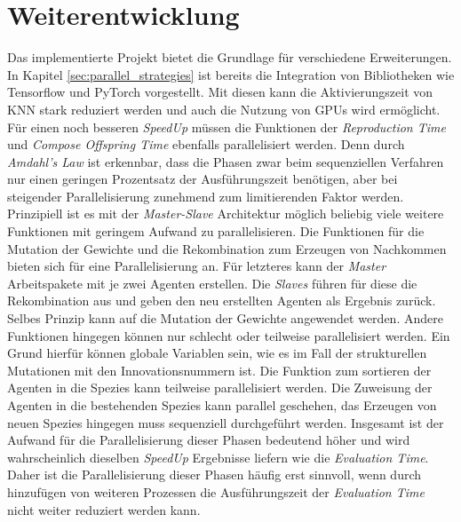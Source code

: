 \section{Weiterentwicklung}
Das implementierte Projekt bietet die Grundlage für verschiedene Erweiterungen. In Kapitel \ref{sec:parallel_strategies} ist bereits die Integration von Bibliotheken wie Tensorflow und PyTorch vorgestellt. Mit diesen kann die Aktivierungszeit von \ac{KNN} stark reduziert werden und auch die Nutzung von \acp{GPU} wird ermöglicht. Für einen noch besseren \emph{SpeedUp} müssen die Funktionen der  \emph{Reproduction Time} und \emph{Compose Offspring Time} ebenfalls parallelisiert werden. Denn durch \emph{Amdahl's Law} ist erkennbar, dass die Phasen zwar beim sequenziellen Verfahren nur einen geringen Prozentsatz der Ausführungszeit benötigen, aber bei steigender Parallelisierung zunehmend zum limitierenden Faktor werden. Prinzipiell ist es mit der \emph{Master-Slave} Architektur möglich beliebig viele weitere Funktionen mit geringem Aufwand zu parallelisieren. 
Die Funktionen für die Mutation der Gewichte und die Rekombination zum Erzeugen von Nachkommen bieten sich für eine Parallelisierung an. Für letzteres kann der \emph{Master} Arbeitspakete mit je zwei Agenten erstellen. Die \emph{Slaves} führen für diese die Rekombination aus und geben den neu erstellten Agenten als Ergebnis zurück. Selbes Prinzip kann auf die Mutation der Gewichte angewendet werden. Andere Funktionen hingegen können nur schlecht oder teilweise parallelisiert werden. Ein Grund hierfür können globale Variablen sein, wie es im Fall der strukturellen Mutationen mit den Innovationsnummern ist. Die Funktion zum sortieren der Agenten in die Spezies kann teilweise parallelisiert werden. Die Zuweisung der Agenten in die bestehenden Spezies kann parallel geschehen, das Erzeugen von neuen Spezies hingegen muss sequenziell durchgeführt werden. Insgesamt ist der Aufwand für die Parallelisierung dieser Phasen bedeutend höher und wird wahrscheinlich dieselben \emph{SpeedUp} Ergebnisse liefern wie die \emph{Evaluation Time}. Daher ist die Parallelisierung dieser Phasen häufig erst sinnvoll, wenn durch hinzufügen von weiteren Prozessen die Ausführungszeit der \emph{Evaluation Time} nicht weiter reduziert werden kann. 





